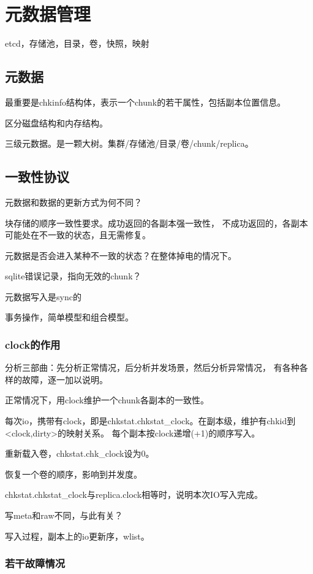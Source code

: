 \chapter{元数据管理}

etcd，存储池，目录，卷，快照，映射

\section{元数据}

最重要是chkinfo结构体，表示一个chunk的若干属性，包括副本位置信息。

区分磁盘结构和内存结构。

三级元数据。是一颗大树。集群/存储池/目录/卷/chunk/replica。

\section{一致性协议}

元数据和数据的更新方式为何不同？

块存储的顺序一致性要求。成功返回的各副本强一致性，
不成功返回的，各副本可能处在不一致的状态，且无需修复。

元数据是否会进入某种不一致的状态？在整体掉电的情况下。

sqlite错误记录，指向无效的chunk？

元数据写入是sync的

事务操作，简单模型和组合模型。

\subsection{clock的作用}

分析三部曲：先分析正常情况，后分析并发场景，然后分析异常情况，
有各种各样的故障，逐一加以说明。

正常情况下，用clock维护一个chunk各副本的一致性。

每次io，携带有clock，即是chkstat.chkstat\_clock。在副本级，维护有chkid到<clock,dirty>的映射关系。
每个副本按clock递增(+1)的顺序写入。

重新载入卷，chkstat.chk\_clock设为0。

恢复一个卷的顺序，影响到并发度。

chkstat.chkstat\_clock与replica.clock相等时，说明本次IO写入完成。

写meta和raw不同，与此有关？

写入过程，副本上的io更新序，wlist。

\subsection{若干故障情况}

